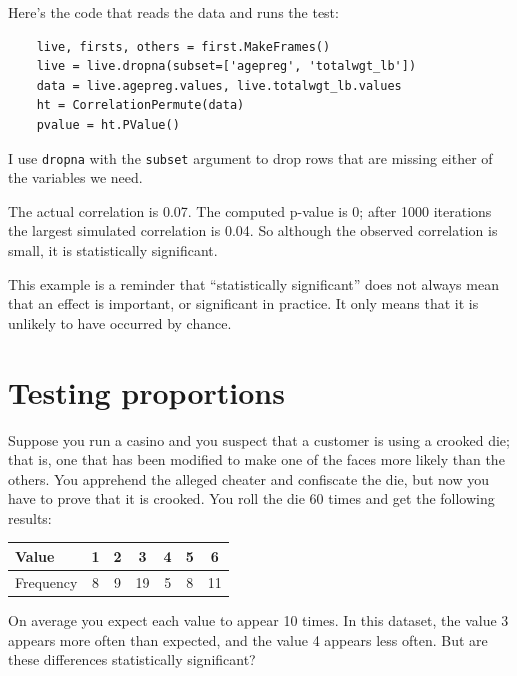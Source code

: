 \documentclass[12pt]{book}
\begin{document}
Here's the code that reads the data and runs the test:

\begin{verbatim}
    live, firsts, others = first.MakeFrames()
    live = live.dropna(subset=['agepreg', 'totalwgt_lb'])
    data = live.agepreg.values, live.totalwgt_lb.values
    ht = CorrelationPermute(data)
    pvalue = ht.PValue()
\end{verbatim}

I use \verb"dropna" with the \verb"subset" argument to drop rows
that are missing either of the variables we need.

The actual correlation is 0.07.  The computed p-value is 0; after 1000
iterations the largest simulated correlation is 0.04.  So although the
observed correlation is small, it is statistically significant.
   

This example is a reminder that ``statistically significant'' does not
always mean that an effect is important, or significant in practice.
It only means that it is unlikely to have occurred by chance.


\section{Testing proportions}
\label{casino}

Suppose you run a casino and you suspect that a customer is
using a crooked die; that
is, one that has been modified to make one of the faces more
likely than the others.  You apprehend the alleged
cheater and confiscate the die, but now you have to prove that it
is crooked.  You roll the die 60 times and get the following results:

\begin{center}
\begin{tabular}{|l|c|c|c|c|c|c|}
\hline
Value     &  1  &  2  &  3  &  4  &  5  &  6  \\ 
\hline
Frequency &  8  &  9  &  19  &  5  &  8  &  11  \\
\hline
\end{tabular}
\end{center}

On average you expect each value to appear 10 times.  In this
dataset, the value 3 appears more often than expected, and the value 4
appears less often.  But are these differences statistically
significant?
   
\end{document}
